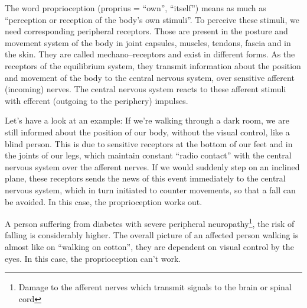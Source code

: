 \documentclass[../main.tex]{subfiles}
\begin{document}
The word  proprioception (proprius = ``own'', ``itself'') means as much as ``{perception} or reception of the {body's own stimuli}''.
To perceive these stimuli, we need corresponding {peripheral receptors}.
Those are present in the posture and movement system of the body in joint capsules, muscles, tendons, fascia and in the skin.
They are called {mechano--receptors} and exist in different forms. 
As the receptors of the equilibrium system, they transmit information about the {position and movement of the body} to the central nervous system, over sensitive afferent (incoming) nerves.
The central nervous system {reacts} to these afferent stimuli with efferent (outgoing to the periphery) impulses.

Let's have a look at an example: \newline
If we're walking through a dark room, we are still informed about the position of our body, without the visual control, like a blind person.
This is due to sensitive receptors at the bottom of our feet and in the joints of our legs, which maintain constant ``radio contact'' with the central nervous system over the afferent nerves.
If we would suddenly step on an inclined plane, these receptors sends the news of this event immediately to the central nervous system, which in turn initiated to counter movements, so that a fall can be avoided.
In this case, the proprioception works out.

A person suffering from diabetes with severe peripheral neuropathy\footnote{Damage to the afferent nerves which transmit signals to the brain or spinal cord},
the risk of falling is considerably higher.
The overall picture of an affected person walking is almost like on ``walking on cotton'', they are dependent on visual control by the eyes.
In this case, the proprioception can't work.
\end{document}
